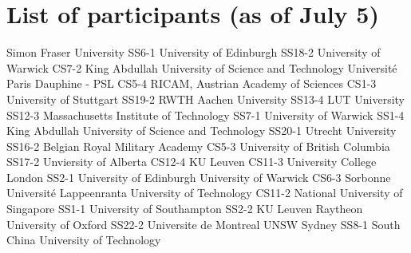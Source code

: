 \chapter{List of participants (as of July 5)}

\setlength{\columnsep}{1cm}

\begin{multicols}{2}

\small
\raggedright

{ Simon Fraser University }
{SS6-1}
{}
{ University of Edinburgh }
{SS18-2}
{}
{ University of Warwick }
{CS7-2}
{}
{ King Abdullah University of Science and Technology }
{}
{}
{ Université Paris Dauphine - PSL }
{CS5-4}
{}
{ RICAM, Austrian Academy of Sciences }
{CS1-3}
{}
{ University of Stuttgart }
{SS19-2}
{}
{ RWTH Aachen University }
{SS13-4}
{}
{ LUT University }
{SS12-3}
{}
{ Massachusetts Institute of Technology }
{SS7-1}
{}
{ University of Warwick }
{SS1-4}
{}
{ King Abdullah University of Science and Technology }
{SS20-1}
{}
{ Utrecht University }
{SS16-2}
{}
{ Belgian Royal Military Academy }
{CS5-3}
{}
{ University of British Columbia }
{SS17-2}
{}
{ Unviersity of Alberta }
{CS12-4}
{}
{ KU Leuven }
{CS11-3}
{}
{ University College London }
{SS2-1}
{}
{ University of Edinburgh }
{}
{}
{ University of Warwick }
{CS6-3}
{}
{ Sorbonne Université }
{}
{}
{ Lappeenranta University of Technology }
{CS11-2}
{}
{ National University of Singapore }
{SS1-1}
{}
{ University of Southampton }
{SS2-2}
{}
{ KU Leuven }
{}
{}
{ Raytheon }
{}
{}
{ University of Oxford }
{SS22-2}
{}
{ Universite de Montreal }
{}
{}
{ UNSW Sydney }
{SS8-1}
{}
{ South China University of Technology }

\end{multicols}
